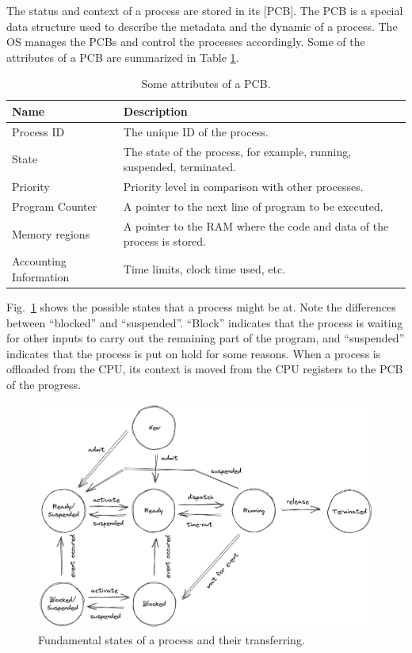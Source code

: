 The status and context of a process are stored in its [PCB]. The PCB is a special data structure used to describe the metadata and the dynamic of a process. The OS manages the PCBs and control the processes accordingly. Some of the attributes of a PCB are summarized in Table \ref{ch:pm:tab:pcbcontent}.

\begin{table}[!htb]
	\centering \caption{Some attributes of a PCB.}\label{ch:pm:tab:pcbcontent}
	\begin{tabularx}{\textwidth}{lX}
		\hline
		Name & Description \\ \hline
		Process ID & The unique ID of the process.  \\
		State & The state of the process, for example, running, suspended, terminated.  \\
		Priority & Priority level in comparison with other processes. \\
		Program Counter & A pointer to the next line of program to be executed. \\
		Memory regions & A pointer to the RAM where the code and data of the process is stored. \\
		Accounting Information & Time limits, clock time used, etc. \\ \hline
	\end{tabularx}
\end{table}

Fig.~\ref{ch:pm:fig:processstatetransfer} shows the possible states that a process might be at. Note the differences between ``blocked'' and ``suspended''. ``Block'' indicates that the process is waiting for other inputs to carry out the remaining part of the program, and ``suspended'' indicates that the process is put on hold for some reasons. When a process is offloaded from the CPU, its context is moved from the CPU registers to the PCB of the progress.

\begin{figure}[!htb]
	\centering
	\includegraphics[width=350pt]{chapters/part-1/figures/processstatetransfer.png}
	\caption{Fundamental states of a process and their transferring.} \label{ch:pm:fig:processstatetransfer}
\end{figure}

